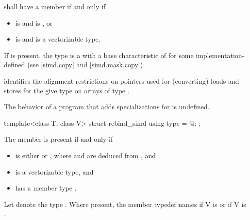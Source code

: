 \begin{itemdescr}
\pnum
{} shall have a member  if and only if
\begin{itemize}
  \item {} is  and  is , or
  \item {} is  and  is a vectorizable type.
\end{itemize}

\pnum
If  is present, the type  is a  with a base characteristic of  for some implementation-defined  (see \ref{simd.copy} and \ref{simd.mask.copy}). \begin{note} identifies the alignment restrictions on pointers used for (converting) loads and stores for the give type  on arrays of type .\end{note}

\pnum
The behavior of a program that adds specializations for  is undefined.
\end{itemdescr}

\begin{itemdecl}
template<class T, class V> struct rebind_simd { using type = @\seebelow@; };
\end{itemdecl}

\begin{itemdescr}
  \pnum
  The member  is present if and only if
  \begin{itemize}
    \item {} is either  or , where  and  are deduced from , and
    \item {} is a vectorizable type, and
    \item {} has a member type .
  \end{itemize}

  \pnum
  Let  denote the type .
  Where present, the member typedef  names
   if \tcode V is  or
   if \tcode V is .
\end{itemdescr}

